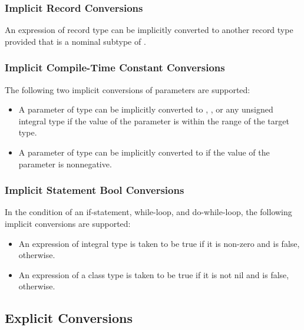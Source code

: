 \subsubsection{Implicit Record Conversions}
\label{Implicit_Record_Conversions}

An expression of record type  can be implicitly converted to
another record type  provided that  is a nominal
subtype of .

\subsubsection{Implicit Compile-Time Constant Conversions}
\label{Implicit_Compile_Time_Constant_Conversions}

The following two implicit conversions of parameters are supported:
\begin{itemize}
\item A parameter of type  can be implicitly converted
to , , or any unsigned integral type if the
value of the parameter is within the range of the target type.
\item A parameter of type  can be implicitly converted
to  if the value of the parameter is nonnegative.
\end{itemize}

\subsubsection{Implicit Statement Bool Conversions}
\label{Implicit_Statement_Bool_Conversions}

In the condition of an if-statement, while-loop, and do-while-loop,
the following implicit conversions are supported:
\begin{itemize}
\item An expression of integral type is taken to be true if it is non-zero and is false, otherwise.
\item An expression of a class type is taken to be true if it is not nil and is false, otherwise.
\end{itemize}

\subsection{Explicit Conversions}
\label{Explicit_Conversions}

